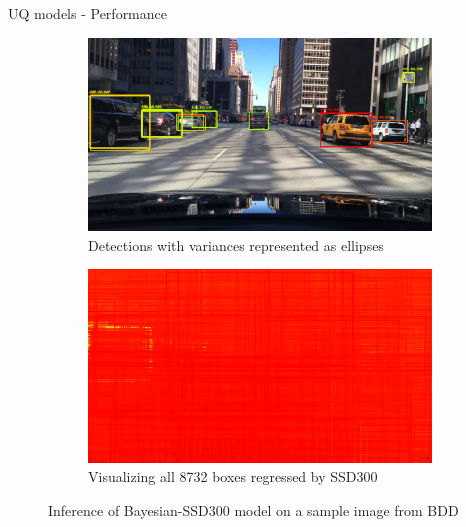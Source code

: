 \documentclass[10pt, aspectratio=169]{beamer}
\begin{document}
\begin{frame}[allowframebreaks]{UQ models - Performance}
       \begin{figure}[H]
        \captionsetup[table]{skip=0pt}
           \centering
           \begin{subfigure}[t]{0.495\textwidth}
               \centering
               \includegraphics[width=\textwidth]{images/det_images/bdd_subens_entropies_0.png}
               \caption{Detections with variances represented as ellipses}
           \end{subfigure}
           \begin{subfigure}[t]{0.495\textwidth}
               \centering
               \includegraphics[width=\textwidth]{images/det_images/all_subens_bdd_1.png}
               \caption{Visualizing all 8732 boxes regressed by SSD300}
           \end{subfigure}
           \caption{Inference of Bayesian-SSD300 model on a sample image from BDD}
       \end{figure}
    

\end{frame}
\end{document}
